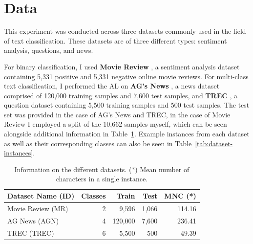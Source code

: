\documentclass[english,bachelor,ul]{webisthesis} %
\begin{document}
\section{Data}

This experiment was conducted across three datasets commonly used in the field of text classification. These datasets are of three different types: sentiment analysis, questions, and news. 

For binary classification, I used \textbf{Movie Review} \citep{DBLP:conf/acl/PangL05}, a sentiment analysis dataset containing 5,331 positive and 5,331 negative online movie reviews. For multi-class text classification, I performed the AL on \textbf{AG's News} \citep{DBLP:conf/nips/ZhangZL15}, a news dataset comprised of 120,000 training samples and 7,600 test samples, and \textbf{TREC} \citep{DBLP:journals/nle/LiR06}, a question dataset containing 5,500 training samples and 500 test samples. The test set was provided in the case of AG's News and TREC, in the case of Movie Review I employed a split of the 10,662 samples myself, which can be seen alongside additional information in Table~\ref{tab:dataset-table}. Example instances from each dataset as well as their corresponding classes can also be seen in Table~\ref{tab:dataset-instances}.

\vspace{1\baselineskip}

\begin{table}[htpb]
    \centering
    \setlength{\tabcolsep}{16pt} %
    \begin{tabular}{@{}lrrrr@{}} %
        \toprule
        \bfseries Dataset Name \scriptsize (ID) & \bfseries Classes & \bfseries Train & \bfseries Test & \bfseries MNC (*) \\
        \midrule
        Movie Review \scriptsize (MR) & 2 & 9,596 & 1,066 & 114.16 \\
        AG News \scriptsize (AGN) & 4 & 120,000 & 7,600 &  236.41 \\
        TREC \scriptsize (TREC) & 6 & 5,500 & 500 & 49.39 \\
        \bottomrule
    \end{tabular}
    \caption{Information on the different datasets. (*) Mean number of characters in a single instance.}
  \label{tab:dataset-table}%
\end{table}
\end{document}
